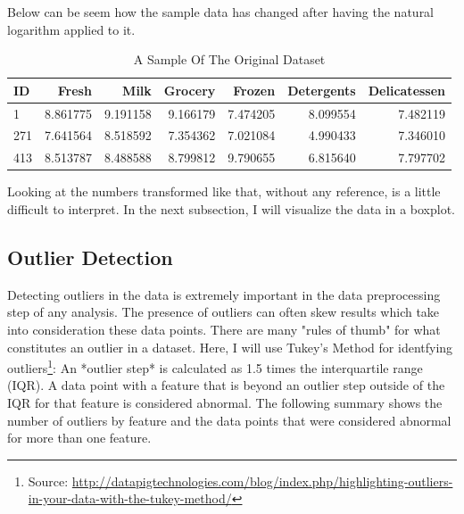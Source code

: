 \documentclass[a4paper]{article}
\begin{document}
Below can be seem how the sample data has changed after having the natural logarithm applied to it.

\begin{table}[ht!]
\centering
\begin{tabular}{l|rrrrrr}
{ID} &    Fresh &     Milk &  Grocery &    Frozen & Detergents & Delicatessen \\\hline
1   &  8.861775 &  9.191158 &  9.166179 &  7.474205 &          8.099554 &      7.482119 \\
271 &  7.641564 &  8.518592 &  7.354362 &  7.021084 &          4.990433 &      7.346010 \\
413 &  8.513787 &  8.488588 &  8.799812 &  9.790655 &          6.815640 &      7.797702 \\

\end{tabular}
\caption{\label{tab:sample}A Sample Of The Original Dataset}
\end{table}

Looking at the numbers transformed like that, without any reference, is a little difficult to interpret. In the next subsection, I will visualize the data in a boxplot.


\subsection{Outlier Detection}

Detecting outliers in the data is extremely important in the data preprocessing step of any analysis. The presence of outliers can often skew results which take into consideration these data points. There are many "rules of thumb" for what constitutes an outlier in a dataset. Here, I will use Tukey's Method for identfying outliers\footnote{Source: \url{http://datapigtechnologies.com/blog/index.php/highlighting-outliers-in-your-data-with-the-tukey-method/}}: An *outlier step* is calculated as 1.5 times the interquartile range (IQR). A data point with a feature that is beyond an outlier step outside of the IQR for that feature is considered abnormal. The following summary shows the number of outliers by feature and the data points that were considered abnormal for more than one feature.
\end{document}
